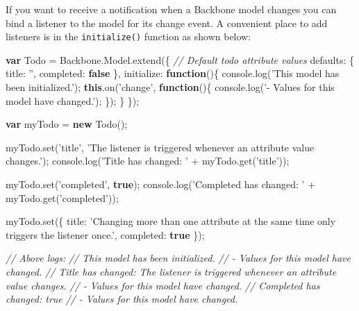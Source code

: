 \documentclass[9pt]{book}
\newenvironment{Shaded}{}{}
\newcommand{\KeywordTok}[1]{\textcolor[rgb]{0.00,0.44,0.13}{\textbf{{#1}}}}
\newcommand{\DataTypeTok}[1]{\textcolor[rgb]{0.56,0.13,0.00}{{#1}}}
\newcommand{\StringTok}[1]{\textcolor[rgb]{0.25,0.44,0.63}{{#1}}}
\newcommand{\CommentTok}[1]{\textcolor[rgb]{0.38,0.63,0.69}{\textit{{#1}}}}
\newcommand{\OtherTok}[1]{\textcolor[rgb]{0.00,0.44,0.13}{{#1}}}
\newcommand{\FunctionTok}[1]{\textcolor[rgb]{0.02,0.16,0.49}{{#1}}}
\newcommand{\NormalTok}[1]{{#1}}
\begin{document}
If you want to receive a notification when a Backbone model changes you
can bind a listener to the model for its change event. A convenient
place to add listeners is in the \texttt{initialize()} function as shown
below:

\begin{Shaded}
\begin{Highlighting}[]
\KeywordTok{var} \NormalTok{Todo = }\OtherTok{Backbone}\NormalTok{.}\OtherTok{Model}\NormalTok{.}\FunctionTok{extend}\NormalTok{(\{}
  \CommentTok{// Default todo attribute values}
  \DataTypeTok{defaults}\NormalTok{: \{}
    \DataTypeTok{title}\NormalTok{: }\StringTok{''}\NormalTok{,}
    \DataTypeTok{completed}\NormalTok{: }\KeywordTok{false}
  \NormalTok{\},}
  \DataTypeTok{initialize}\NormalTok{: }\KeywordTok{function}\NormalTok{()\{}
    \OtherTok{console}\NormalTok{.}\FunctionTok{log}\NormalTok{(}\StringTok{'This model has been initialized.'}\NormalTok{);}
    \KeywordTok{this}\NormalTok{.}\FunctionTok{on}\NormalTok{(}\StringTok{'change'}\NormalTok{, }\KeywordTok{function}\NormalTok{()\{}
        \OtherTok{console}\NormalTok{.}\FunctionTok{log}\NormalTok{(}\StringTok{'- Values for this model have changed.'}\NormalTok{);}
    \NormalTok{\});}
  \NormalTok{\}}
\NormalTok{\});}

\KeywordTok{var} \NormalTok{myTodo = }\KeywordTok{new} \FunctionTok{Todo}\NormalTok{();}

\OtherTok{myTodo}\NormalTok{.}\FunctionTok{set}\NormalTok{(}\StringTok{'title'}\NormalTok{, }\StringTok{'The listener is triggered whenever an attribute value changes.'}\NormalTok{);}
\OtherTok{console}\NormalTok{.}\FunctionTok{log}\NormalTok{(}\StringTok{'Title has changed: '} \NormalTok{+ }\OtherTok{myTodo}\NormalTok{.}\FunctionTok{get}\NormalTok{(}\StringTok{'title'}\NormalTok{));}


\OtherTok{myTodo}\NormalTok{.}\FunctionTok{set}\NormalTok{(}\StringTok{'completed'}\NormalTok{, }\KeywordTok{true}\NormalTok{);}
\OtherTok{console}\NormalTok{.}\FunctionTok{log}\NormalTok{(}\StringTok{'Completed has changed: '} \NormalTok{+ }\OtherTok{myTodo}\NormalTok{.}\FunctionTok{get}\NormalTok{(}\StringTok{'completed'}\NormalTok{));}

\OtherTok{myTodo}\NormalTok{.}\FunctionTok{set}\NormalTok{(\{}
  \DataTypeTok{title}\NormalTok{: }\StringTok{'Changing more than one attribute at the same time only triggers the listener once.'}\NormalTok{,}
  \DataTypeTok{completed}\NormalTok{: }\KeywordTok{true}
\NormalTok{\});}

\CommentTok{// Above logs:}
\CommentTok{// This model has been initialized.}
\CommentTok{// - Values for this model have changed.}
\CommentTok{// Title has changed: The listener is triggered whenever an attribute value changes.}
\CommentTok{// - Values for this model have changed.}
\CommentTok{// Completed has changed: true}
\CommentTok{// - Values for this model have changed.}
\end{Highlighting}
\end{Shaded}
\end{document}
